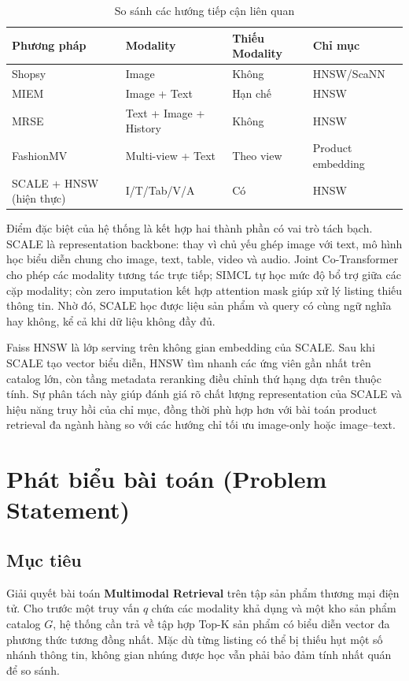 \documentclass[10pt,conference]{IEEEtran}
\begin{document}
\begin{table}[t]
\centering
\caption{So sánh các hướng tiếp cận liên quan}
\label{tab:related}
\small
\begin{tabular}{L{1.65cm}L{1.65cm}L{1.1cm}L{1.15cm}}
\toprule
\textbf{Phương pháp} & \textbf{Modality} & \textbf{Thiếu Modality} & \textbf{Chỉ mục}\\
\midrule
Shopsy & Image & Không & HNSW/\allowbreak ScaNN\\
MIEM & Image + Text & Hạn chế & HNSW\\
MRSE & Text + Image + History & Không & HNSW\\
FashionMV & Multi-view + Text & Theo view & Product embedding\\
SCALE + HNSW (hiện thực) & I/T/Tab/V/A & Có & HNSW\\
\bottomrule
\end{tabular}
\end{table}

Điểm đặc biệt của hệ thống là kết hợp hai thành phần có vai trò tách bạch. SCALE là representation backbone: thay vì chủ yếu ghép image với text, mô hình học biểu diễn chung cho image, text, table, video và audio. Joint Co-Transformer cho phép các modality tương tác trực tiếp; SIMCL tự học mức độ bổ trợ giữa các cặp modality; còn zero imputation kết hợp attention mask giúp xử lý listing thiếu thông tin. Nhờ đó, SCALE học được liệu sản phẩm và query có cùng ngữ nghĩa hay không, kể cả khi dữ liệu không đầy đủ.

Faiss HNSW là lớp serving trên không gian embedding của SCALE. Sau khi SCALE tạo vector biểu diễn, HNSW tìm nhanh các ứng viên gần nhất trên catalog lớn, còn tầng metadata reranking điều chỉnh thứ hạng dựa trên thuộc tính. Sự phân tách này giúp đánh giá rõ chất lượng representation của SCALE và hiệu năng truy hồi của chỉ mục, đồng thời phù hợp hơn với bài toán product retrieval đa ngành hàng so với các hướng chỉ tối ưu image-only hoặc image--text.

\section{Phát biểu bài toán (Problem Statement)}

\subsection{Mục tiêu}
Giải quyết bài toán \textbf{Multimodal Retrieval} trên tập sản phẩm thương mại điện tử. Cho trước một truy vấn $q$ chứa các modality khả dụng và một kho sản phẩm catalog $G$, hệ thống cần trả về tập hợp Top-K sản phẩm có biểu diễn vector đa phương thức tương đồng nhất. Mặc dù từng listing có thể bị thiếu hụt một số nhánh thông tin, không gian nhúng được học vẫn phải bảo đảm tính nhất quán để so sánh.
\end{document}
